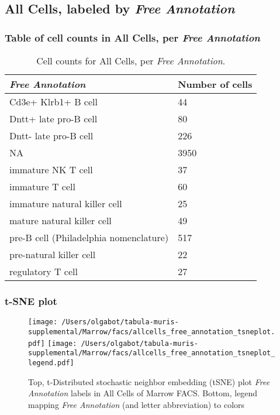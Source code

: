 \clearpage

\subsection{All Cells, labeled by \emph{Free Annotation}}
\subsubsection{Table of cell counts in All Cells, per \emph{Free Annotation}}\begin{table}[h]
\centering
\label{my-label}
\begin{tabular}{@{}ll@{}}
\toprule

\emph{Free Annotation}& Number of cells \\ \midrule
Cd3e+ Klrb1+ B cell & 44 \\

Dntt+ late pro-B cell & 80 \\

Dntt- late pro-B cell & 226 \\

NA & 3950 \\

immature NK T cell & 37 \\

immature T cell & 60 \\

immature natural killer cell & 25 \\

mature natural killer cell & 49 \\

pre-B cell (Philadelphia nomenclature) & 517 \\

pre-natural killer cell & 22 \\

regulatory T cell & 27 \\
\bottomrule
\end{tabular}
\caption{Cell counts for All Cells, per \emph{Free Annotation}.}
\end{table}

\clearpage
\subsubsection{t-SNE plot}
\begin{figure}[h]
\centering
\texttt{[image: /Users/olgabot/tabula-muris-supplemental/Marrow/facs/allcells\_free\_annotation\_tsneplot.pdf]}
\texttt{[image: /Users/olgabot/tabula-muris-supplemental/Marrow/facs/allcells\_free\_annotation\_tsneplot\_legend.pdf]}
\caption{Top, t-Distributed stochastic neighbor embedding (tSNE) plot  \emph{Free Annotation} labels in All Cells of Marrow FACS. Bottom, legend mapping \emph{Free Annotation} (and letter abbreviation) to colors}
\end{figure}


